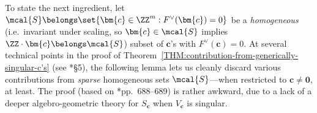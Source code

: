 \documentclass[12pt]{report}
\begin{document}
To state the next ingredient, let $\mcal{S}\belongs\set{\bm{c}\in\ZZ^m:F^\vee(\bm{c})=0}$ be a \emph{homogeneous}
(i.e.~invariant under scaling, so $\bm{c}\in\mcal{S}$ implies $\ZZ\cdot\bm{c}\belongs\mcal{S}$)
subset of $\bm{c}$'s with $F^\vee(\bm{c})=0$.
At several technical points
in the proof of Theorem~\ref{THM:contribution-from-generically-singular-c's} (see \cite{wang2021_isolating_special_solutions}*{\S5}),
the following lemma lets us cleanly discard various contributions from
\emph{sparse} homogeneous sets $\mcal{S}$---when restricted to $\bm{c}\neq\bm{0}$, at least.
The proof (based on \cite{heath1998circle}*{pp.~688--689}) is rather awkward, due to a lack of a deeper algebro-geometric theory for $S_{\bm{c}}$ when $V_{\bm{c}}$ is singular.
\end{document}
